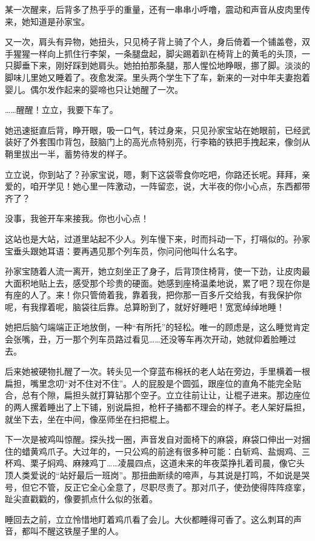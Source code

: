 \documentclass[lang=cn,newtx,12pt,scheme=chinese]{elegantbook}
\begin{document}
某一次醒来，后背多了热乎乎的重量，还有一串串小呼噜，震动和声音从皮肉里传来，她知道是孙家宝。

又一次，肩头有异物，她扭头，只见椅子背上骑了个人，身后倚着一个铺盖卷，双手猩猩一样向上抓住行李架，一条腿盘起，脚尖踢着趴在椅背上的黄毛的头顶，一只脚垂下来，刚好踩到她肩头。她拍拍那条腿，那人惺忪地睁眼，挪了脚。淡淡的脚味儿里她又睡着了。夜愈发深。里头两个学生下了车，新来的一对中年夫妻抱着婴儿。偶尔发作起来的婴啼也只让她醒了一次。

……醒醒！立立，我要下车了。

她迅速挺直后背，睁开眼，吸一口气，转过身来，只见孙家宝站在她眼前，已经武装好了外套围巾背包，鼓脑门上的高光点特别亮，行李箱的铁把手拽起来，像剑从鞘里拔出一半，蓄势待发的样子。

立立说，你到站了？孙家宝说，嗯，剩下这袋零食你吃吧，你路还长呢。拜拜，亲爱的，咱开学见！她心里一阵激动，一阵留恋，说，大半夜的你小心点，东西都带齐了？

没事，我爸开车来接我。你也小心点！

这站也是大站，过道里站起不少人。列车慢下来，时而抖动一下，打嗝似的。孙家宝垂头跟她耳语：要再遇见那个列车员，你问问他叫什么名字。

孙家宝随着人流一离开，她立刻坐正了身子，后背顶住椅背，使一下劲，让皮肉最大面积地贴上去，感受那个珍贵的硬面。她感到座椅温柔地说，累了吧？现在你是有座的人了。来！你只管倚着我，靠着我，把你那一百多斤交给我，有我保护你呢，有我撑着呢，脑袋往后靠。总算盼到了，就好好睡吧！宽宽绰绰地睡！

她把后脑勺端端正正地放倒，一种“有所托”的轻松。唯一的顾虑是，这么睡觉肯定会张嘴，丑，万一那个列车员路过看见……还没等车再次开动，她就仰着脸睡过去。

后来她被硬物扎醒了一次。转头见一个穿蓝布棉袄的老人站在旁边，手里横着一根扁担，嘴里念叨“对不住对不住”。人的屁股是个圆弧，跟座位的直角不能完全贴合，总有个隙，扁担头就打算钻那个空子。立立往前让让，让棍子进来。那边座位的两人摞着睡出了上下铺，别说扁担，枪杆子捅都不理会的样子。老人架好扁担，就坐下去，坐在中间，像巫师坐在扫把棍上。

下一次是被鸡叫惊醒。探头找一圈，声音发自对面椅下的麻袋，麻袋口伸出一对捆住的蜡黄鸡爪子。大过年的，一只公鸡的前途有很多种可能：白斩鸡、盐焗鸡、三杯鸡、栗子焖鸡、麻辣鸡丁……凌晨四点，这道未来的年夜菜挣扎着司晨，像它头顶人类爱说的“站好最后一班岗”。那扭曲断续的啼声，与其说是打鸣，不如说是哭号，但它不管，反正它全心全意了，尽职尽责了。那对爪子，使劲使得阵阵痉挛，趾尖直戳戳的，像要抓点什么似的张着。

睡回去之前，立立怜惜地盯着鸡爪看了会儿。大伙都睡得可香了。这么刺耳的声音，都叫不醒这铁屋子里的人。
\end{document}
